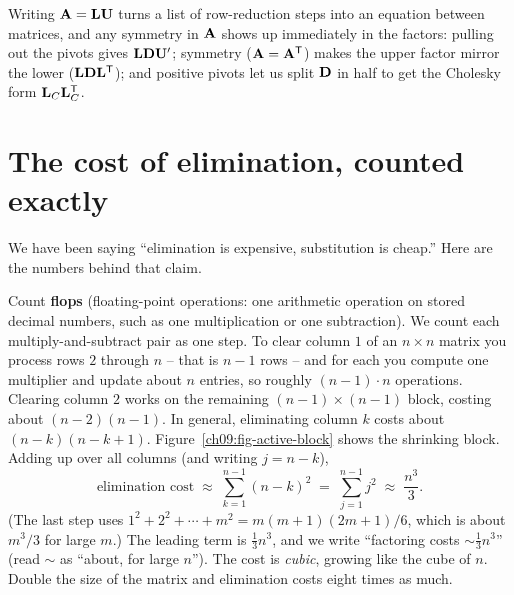 \begin{aestheticbox}
Writing $\mathbf{A}=\mathbf{L}\mathbf{U}$ turns a list of row-reduction steps into an equation
between matrices, and any symmetry in $\mathbf{A}$ shows up immediately in the factors:
pulling out the pivots gives $\mathbf{L}\mathbf{D}\mathbf{U}'$; symmetry ($\mathbf{A}=\mathbf{A}^{\mathsf{T}}$)
makes the upper factor mirror the lower ($\mathbf{L}\mathbf{D}\mathbf{L}^{\mathsf{T}}$); and positive pivots
let us split $\mathbf{D}$ in half to get the Cholesky form $\mathbf{L}_C\mathbf{L}_C^{\mathsf{T}}$.
\end{aestheticbox}

\section{The cost of elimination, counted exactly}
\label{ch09:cost}

We have been saying ``elimination is expensive, substitution is cheap.'' Here are the
numbers behind that claim.

Count \textbf{flops} (floating-point operations: one arithmetic operation on stored
decimal numbers, such as one multiplication or one subtraction). We count each
multiply-and-subtract pair as one step. To clear column $1$ of an $n\times n$
matrix you process rows $2$ through $n$ -- that is $n-1$ rows -- and for each you compute one
multiplier and update about $n$ entries, so roughly $(n-1)\cdot n$ operations. Clearing
column $2$ works on the remaining $(n-1)\times(n-1)$ block, costing about $(n-2)(n-1)$. In
general, eliminating column $k$ costs about $(n-k)(n-k+1)$.
Figure~\ref{ch09:fig-active-block} shows the shrinking block. Adding up over all columns
(and writing $j = n-k$),
\[
  \text{elimination cost} \;\approx\; \sum_{k=1}^{n-1} (n-k)^2 \;=\; \sum_{j=1}^{n-1} j^2
  \;\approx\; \frac{n^3}{3}.
\]
(The last step uses $1^2 + 2^2 + \cdots + m^2 = m(m+1)(2m+1)/6$, which is about
$m^3/3$ for large $m$.) The leading term is $\tfrac13 n^3$, and we write ``factoring costs $\sim\tfrac13 n^3$'' (read
$\sim$ as ``about, for large $n$''). The cost is
\emph{cubic}, growing like the cube of $n$. Double the size of the matrix and elimination
costs eight times as much.

